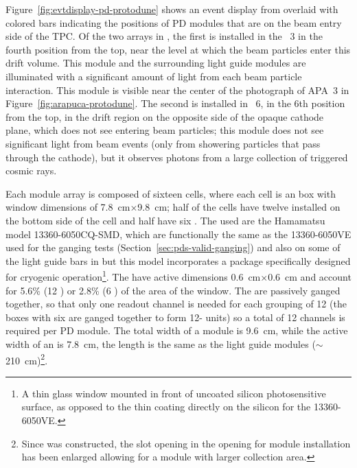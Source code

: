Figure~\ref{fig:evtdisplay-pd-protodune} shows an event display from  overlaid with colored bars indicating the positions of PD modules that are on the beam entry side of the TPC.
Of the two  arrays in , the first is installed in the ~3 in the fourth position from the top, near the level at which the beam particles enter this drift volume. This module and the surrounding light guide modules are illuminated with a significant amount of light from each beam particle interaction. This module is visible near the center of the photograph of APA~3 in Figure~\ref{fig:arapuca-protodune}.
The second is installed in  ~6, in the 6th position from the top, in the drift region on the opposite side of the opaque cathode plane, which does not see entering beam particles; this module does not see significant light from beam events (only from showering particles that pass through the cathode), but it observes photons from a large collection of triggered cosmic rays.
 
Each   module array is composed of sixteen cells, where each cell is an  box with window dimensions of \SI{7.8}{cm}$\times$\SI{9.8}{cm}; half of the cells have twelve  installed on the bottom side of the cell and  half have six . 
The  used are the Hamamatsu model 13360-6050CQ-SMD, which are functionally the same as the 13360-6050VE used for the ganging tests (Section~\ref{sec:pds-valid-ganging}) and also on some of the light guide bars in  but this model incorporates a package specifically designed for cryogenic operation\footnote{A thin glass window mounted in front of uncoated silicon photosensitive surface, as opposed to the thin coating directly on the silicon for the 13360-6050VE.}. 
The  have active dimensions \SI{0.6}{cm}$\times$\SI{0.6}{cm} and account for 5.6\% (\num{12} ) or \num{2.8}\% (\num{6} ) of the area of the window.
The   are passively ganged together, so that only one readout channel is needed for each  grouping of \num{12}  (the boxes with six  are ganged together to form \num{12}- units) so a total of \num{12} channels is required per PD module. 
The total width of a module is \SI{9.6}{cm}, while the active width of an  is \SI{7.8}{cm}, the length is the same as the light guide modules ($\sim$\SI{210}{cm})\footnote{Since  was constructed, the slot opening in the  opening for  module installation has been enlarged allowing for a module with larger collection area.}.



